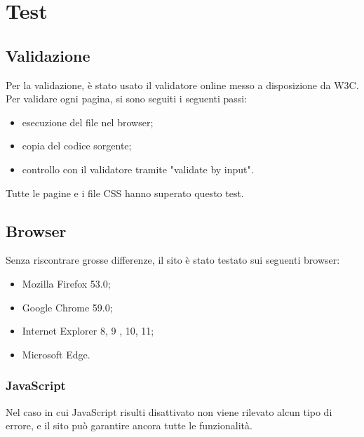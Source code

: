 \section{Test}
\subsection{Validazione}
Per la validazione, è stato usato il validatore online messo a disposizione da W3C. Per validare ogni pagina, si sono seguiti i seguenti passi:
\begin{itemize}
	\item esecuzione del file nel browser;
	\item copia del codice sorgente;
	\item controllo con il validatore tramite "validate by input".
\end{itemize}
Tutte le pagine e i file CSS hanno superato questo test.
\subsection{Browser}
Senza riscontrare grosse differenze, il sito è stato testato sui seguenti browser:
\begin{itemize}
	\item Mozilla Firefox 53.0;
	\item Google Chrome 59.0;
	\item Internet Explorer 8, 9 , 10, 11;
	\item Microsoft Edge.
\end{itemize}
\subsubsection{JavaScript}
Nel caso in cui JavaScript risulti disattivato non viene rilevato alcun tipo di errore, e il sito può garantire ancora tutte le funzionalità.
